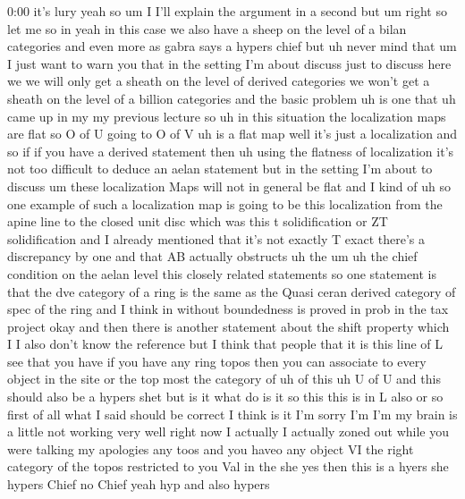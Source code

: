 \begin{unfinished}{0:00}
it's  lury  yeah  so  um  I  I'll  explain  the
argument  in  a  second  but  um
right  so  let  me  so  in  yeah  in  this  case
we  also  have  a  sheep  on  the  level  of  a
bilan  categories  and  even  more  as  gabra
says  a  hypers  chief  but  uh  never  mind
that  um  I  just  want  to  warn  you  that  in
the  setting  I'm  about  discuss  just  to
discuss  here  we  we  will  only  get  a
sheath  on  the  level  of  derived
categories  we  won't  get  a  sheath  on  the
level  of  a  billion  categories  and  the
basic  problem  uh  is  one  that  uh  came  up
in  my  my  previous  lecture  so
uh  in  this  situation  the  localization
maps  are  flat  so  O  of  U  going  to  O  of  V
uh  is  a  flat  map  well  it's  just  a
localization  and  so  if  if  you  have  a
derived  statement  then  uh  using  the
flatness  of  localization  it's  not  too
difficult  to  deduce  an  aelan  statement
but  in  the  setting  I'm  about  to  discuss
um  these  localization  Maps  will  not  in
general  be  flat  and  I  kind  of  uh  so  one
example  of  such  a  localization  map  is
going  to  be  this  localization  from  the
apine  line  to  the  closed  unit  disc  which
was  this  t  solidification  or  ZT
solidification  and  I  already  mentioned
that  it's  not  exactly  T  exact  there's  a
discrepancy  by  one  and  that  AB  actually
obstructs  uh  the  um  uh  the  chief
condition  on  the  aelan  level  this
closely  related  statements  so  one
statement  is  that  the  dve  category  of  a
ring  is  the  same  as  the  Quasi  ceran
derived  category  of  spec  of  the  ring  and
I  think  in  without  boundedness  is  proved
in  prob  in  the  tax  project  okay  and  then
there  is  another  statement  about  the
shift  property  which  I  I  also  don't  know
the  reference  but  I  think  that  people
that  it  is  this  line  of  L  see  that  you
have  if  you  have  any  ring  topos  then  you
can  associate  to  every  object  in  the
site  or  the  top  most  the  category  of  uh
of  this  uh  U  of  U  and  this  should  also
be  a  hypers  shet  but  is  it  what  do  is  it
so  this  this  is  in  L  also
or  so  first  of  all  what  I  said  should  be
correct  I  think  is  it  I'm  sorry  I'm  I'm
my  brain  is  a  little  not  working  very
well  right  now  I  actually  I  actually
zoned  out  while  you  were  talking  my
apologies  any  toos  and  you  haveo  any
object  VI  the  right  category  of  the
topos  restricted  to  you  Val  in  the  she
yes  then  this  is  a  hyers  she  hypers
Chief  no  Chief  yeah  hyp  and  also  hypers

\end{unfinished}
